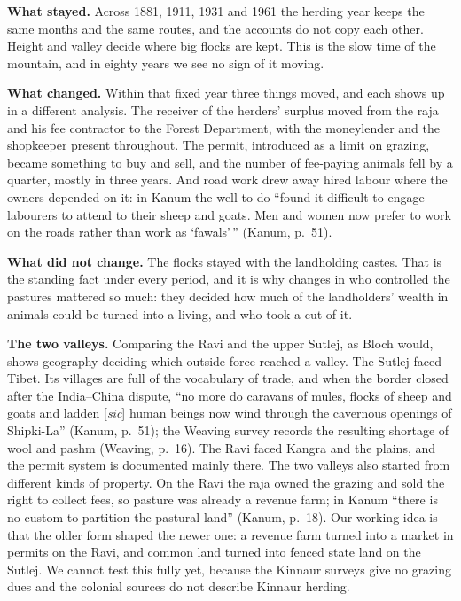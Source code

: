 \documentclass[10pt,a4paper,twocolumn]{article}
\newcommand{\pg}[2]{(#1, p.~#2)}
\begin{document}
\textbf{What stayed.} Across 1881, 1911, 1931 and 1961 the herding year keeps the same months and the same routes, and the accounts do not copy each other. Height and valley decide where big flocks are kept. This is the slow time of the mountain, and in eighty years we see no sign of it moving.

\textbf{What changed.} Within that fixed year three things moved, and each shows up in a different analysis. The receiver of the herders' surplus moved from the raja and his fee contractor to the Forest Department, with the moneylender and the shopkeeper present throughout. The permit, introduced as a limit on grazing, became something to buy and sell, and the number of fee-paying animals fell by a quarter, mostly in three years. And road work drew away hired labour where the owners depended on it: in Kanum the well-to-do ``found it difficult to engage labourers to attend to their sheep and goats. Men and women now prefer to work on the roads rather than work as `fawals'\,'' \pg{Kanum}{51}.

\textbf{What did not change.} The flocks stayed with the landholding castes. That is the standing fact under every period, and it is why changes in who controlled the pastures mattered so much: they decided how much of the landholders' wealth in animals could be turned into a living, and who took a cut of it.

\textbf{The two valleys.} Comparing the Ravi and the upper Sutlej, as Bloch would, shows geography deciding which outside force reached a valley. The Sutlej faced Tibet. Its villages are full of the vocabulary of trade, and when the border closed after the India--China dispute, ``no more do caravans of mules, flocks of sheep and goats and ladden [\emph{sic}] human beings now wind through the cavernous openings of Shipki-La'' \pg{Kanum}{51}; the Weaving survey records the resulting shortage of wool and pashm \pg{Weaving}{16}. The Ravi faced Kangra and the plains, and the permit system is documented mainly there. The two valleys also started from different kinds of property. On the Ravi the raja owned the grazing and sold the right to collect fees, so pasture was already a revenue farm; in Kanum ``there is no custom to partition the pastural land'' \pg{Kanum}{18}. Our working idea is that the older form shaped the newer one: a revenue farm turned into a market in permits on the Ravi, and common land turned into fenced state land on the Sutlej. We cannot test this fully yet, because the Kinnaur surveys give no grazing dues and the colonial sources do not describe Kinnaur herding.
\end{document}
